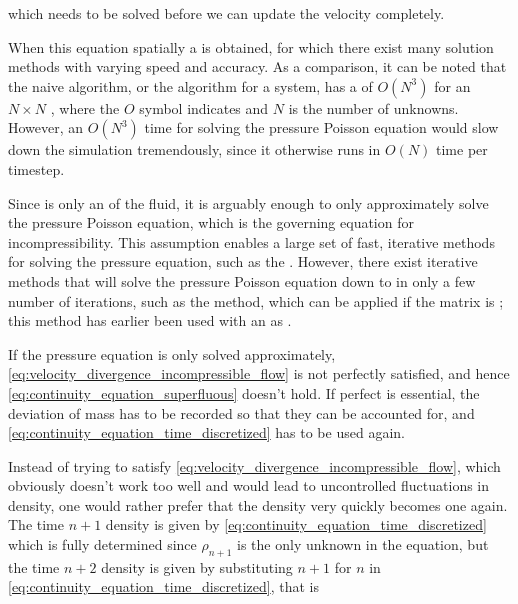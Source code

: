 which needs to be solved before we can update the velocity completely.

When  this equation spatially a  is obtained, for which there exist many solution methods with varying speed and accuracy. As a comparison, it can be noted that the naive  algorithm, or the  algorithm for a  system, has a  of $O(N^3)$ for an $N\times N$ , where the $O$ symbol indicates  and $N$ is the number of unknowns. However, an $O(N^3)$ time for solving the pressure Poisson equation would slow down the simulation tremendously, since it otherwise runs in $O(N)$ time per timestep.

Since \incompressibility is only an \approximate \property of the fluid, it is arguably enough to only approximately solve the pressure Poisson equation, which is the governing equation for incompressibility. This assumption enables a large set of fast, iterative methods for solving the pressure equation, such as the   \citep{Popinet2003}. However, there exist iterative methods that will solve the pressure Poisson equation down to  in only a few number of iterations, such as the \PCG method, which can be applied if the matrix is ; this method has earlier been used with an  as \preconditioner \citep{Losasso2004}.

If the pressure equation is only solved approximately, \eqref{eq:velocity_divergence_incompressible_flow} is not perfectly satisfied, and hence \eqref{eq:continuity_equation_superfluous} doesn't hold. If perfect  is essential, the deviation of mass has to be recorded so that they can be accounted for, and \eqref{eq:continuity_equation_time_discretized} has to be used again.

Instead of trying to satisfy \eqref{eq:velocity_divergence_incompressible_flow}, which obviously doesn't work too well and would lead to uncontrolled fluctuations in density, one would rather prefer that the density very quickly becomes one again. The time $n+1$ density is given by \eqref{eq:continuity_equation_time_discretized} which is fully determined since $\rho_{n+1}$ is the only unknown in the equation, but the time $n+2$ density is given by substituting $n+1$ for $n$ in \eqref{eq:continuity_equation_time_discretized}, that is

